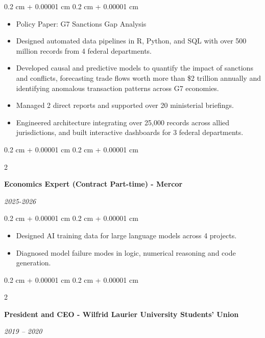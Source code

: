\documentclass[10pt, a4paper]{article}
\newenvironment{highlights}{
    \begin{itemize}[
        topsep=0.10 cm,
        parsep=0.10 cm,
        partopsep=0pt,
        itemsep=0pt,
        leftmargin=0.4 cm + 10pt
    ]
}{
    \end{itemize}
} %
\newenvironment{onecolentry}{
    \begin{adjustwidth}{
        0.2 cm + 0.00001 cm
    }{
        0.2 cm + 0.00001 cm
    }
}{
    \end{adjustwidth}
} %
\newenvironment{twocolentry}[2][]{
    \onecolentry
    \def\secondColumn{#2}
    \setcolumnwidth{\fill, 4.5 cm}
    \begin{paracol}{2}
}{
    \switchcolumn \raggedleft \secondColumn
    \end{paracol}
    \endonecolentry
} %
\begin{document}
        \vspace{0.10 cm}
        \begin{onecolentry}
            \begin{highlights}
                \item Policy Paper: G7 Sanctions Gap Analysis
                
                \item Designed automated data pipelines in R, Python, and SQL with over 500 million records from 4 federal departments.
                \item Developed causal and predictive models to quantify the impact of sanctions and conflicts, forecasting trade flows worth more than \$2 trillion annually and identifying anomalous transaction patterns across G7 economies.
                \item Managed 2 direct reports and supported over 20 ministerial briefings.
                \item Engineered architecture integrating over 25,000 records across allied jurisdictions, and built interactive dashboards for 3 federal departments.
            \end{highlights}
        \end{onecolentry}
\vspace{0.2 cm}

        \begin{twocolentry}{\textit{2025-2026}}
            \textbf{Economics Expert (Contract Part-time) - Mercor}
        \end{twocolentry}
        \begin{onecolentry}
    \begin{highlights}
            \item Designed AI training data for large language models across 4 projects.
            \item Diagnosed model failure modes in logic, numerical reasoning and code generation.
    \end{highlights}
        \end{onecolentry}

\vspace{0.2 cm}
            \begin{twocolentry}{\textit{2019 – 2020}}
            \textbf{President and CEO - Wilfrid Laurier University Students' Union }
        \end{twocolentry}
\end{document}
